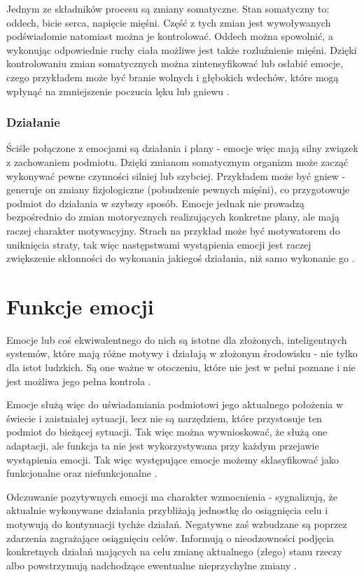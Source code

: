 Jednym ze składników procesu są zmiany somatyczne. Stan somatyczny to: oddech, bicie serca, napięcie mięśni. Część z tych zmian jest wywoływanych podświadomie natomiast można je kontrolować. Oddech można spowolnić, a wykonując odpowiednie ruchy ciała możliwe jest także rozluźnienie mięśni. Dzięki kontrolowaniu zmian somatycznych można zintensyfikować lub osłabić emocje, czego przykładem może być branie wolnych i głębokich wdechów, które mogą wpłynąć na zmniejszenie poczucia lęku lub gniewu \citep{website:samokontrola}.

\subsubsection{Działanie}

Ściśle połączone z emocjami są działania i plany - emocje więc mają silny związek z zachowaniem podmiotu. Dzięki zmianom somatycznym organizm może zacząć wykonywać pewne czynności silniej lub szybciej. Przykładem może być gniew - generuje on zmiany fizjologiczne (pobudzenie pewnych mięśni), co przygotowuje podmiot do działania w szybszy sposób. Emocje jednak nie prowadzą bezpośrednio do zmian motorycznych realizujących konkretne plany, ale mają raczej charakter motywacyjny. Strach na przykład może być motywatorem do uniknięcia straty, tak więc następstwami wystąpienia emocji jest raczej zwiększenie skłonności do wykonania jakiegoś działania, niż samo wykonanie go \citep{ekman}.

\section{Funkcje emocji}

Emocje  lub coś ekwiwalentnego do nich są istotne dla złożonych, inteligentnych systemów, które mają różne motywy i działają w złożonym środowisku - nie tylko dla istot ludzkich. Są one ważne w otoczeniu, które nie jest w pełni poznane i nie jest możliwa jego pełna kontrola \citep{oatly}.

Emocje służą więc do uświadamiania podmiotowi jego aktualnego położenia w świecie i zaistniałej sytuacji, lecz nie są narzędziem, które przystosuje ten podmiot do bieżącej sytuacji. Tak więc można wywnioskować, że służą one adaptacji, ale funkcja ta nie jest wykorzystywana przy każdym przejawie wystąpienia emocji. Tak więc występujące emocje możemy sklasyfikować jako funkcjonalne oraz niefunkcjonalne \citep{ekman}.

Odczuwanie pozytywnych emocji ma charakter wzmocnienia - sygnalizują, że aktualnie wykonywane działania przybliżają jednostkę do osiągnięcia celu i motywują do kontynuacji tychże działań. Negatywne zaś wzbudzane są poprzez zdarzenia zagrażające osiągnięciu celów. Informują o  nieodzowności podjęcia konkretnych działań mających na celu zmianę aktualnego (złego) stanu rzeczy albo powstrzymują nadchodzące ewentualne nieprzychylne zmiany \citep{ekman}.

